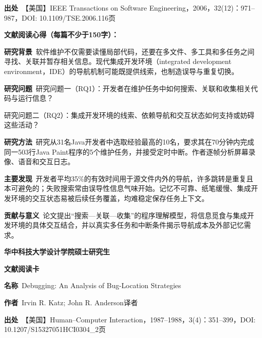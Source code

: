\noindent\textbf{出处}\ 【美国】IEEE Transactions on Software Engineering，2006，32(12)：971–987，DOI: 10.1109/TSE.2006.116\quad 页\par
\vspace{0.35em}
\noindent\textbf{文献阅读心得（每篇不少于150字）：}\par
\noindent\textbf{研究背景}\ 软件维护不仅需要读懂局部代码，还要在多文件、多工具和多任务之间寻找、关联并暂存相关信息。现代集成开发环境（integrated development environment，IDE）的导航机制可能既提供线索，也制造误导与重复切换。\par
\noindent\textbf{研究问题}\ 研究问题一（RQ1）：开发者在维护任务中如何搜索、关联和收集相关代码与运行信息？\par
研究问题二（RQ2）：集成开发环境的线索、依赖导航和交互状态如何支持或妨碍这些活动？\par
\noindent\textbf{研究方法}\ 研究从31名Java开发者中选取经验最高的10名，要求其在70分钟内完成同一503行Java Paint程序的5个维护任务，并接受定时中断。作者逐帧分析屏幕录像、语音和交互日志。\par
\noindent\textbf{主要发现}\ 开发者平均35\%的有效时间用于源文件内外的导航，许多跳转是重复且本可避免的；失败搜索常由误导性信息气味开始。记忆不可靠、纸笔缓慢、集成开发环境的交互状态易被后续任务覆盖，均难稳定保存任务上下文。\par
\noindent\textbf{贡献与意义}\ 论文提出“搜索—关联—收集”的程序理解模型，将信息觅食与集成开发环境的具体交互结合，并以真实多任务和中断条件揭示导航成本及外部记忆需求。\par
\clearpage
\begin{center}
{\songti\bfseries\fontsize{18.5pt}{27.75pt}\selectfont 华中科技大学设计学院硕士研究生\par}
{\songti\bfseries\fontsize{18.5pt}{27.75pt}\selectfont 文献阅读卡\par}
\end{center}
\vspace{0.25em}
\noindent\underline{}\par
\vspace{0.35em}
\noindent\textbf{名称}\ Debugging: An Analysis of Bug-Location Strategies\par
\noindent\textbf{作者}\ Irvin R. Katz; John R. Anderson\quad 译者\par
\noindent\textbf{出处}\ 【美国】Human–Computer Interaction，1987–1988，3(4)：351–399，DOI: 10.1207/S15327051HCI0304\_2\quad 页\par
\vspace{0.35em}
